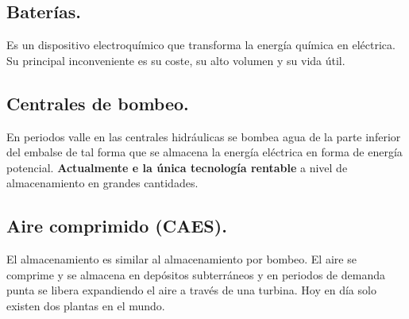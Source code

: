 \subsection{Baterías.}
Es un dispositivo electroquímico que transforma la energía química en eléctrica. Su principal inconveniente es su coste, su alto volumen y su vida útil.
\subsection{Centrales de bombeo.}
En periodos valle en las centrales hidráulicas se bombea agua de la parte inferior del embalse de tal forma que se almacena la energía eléctrica en forma de energía potencial. \textbf{Actualmente e la única tecnología rentable} a nivel de almacenamiento en grandes cantidades.
\subsection{Aire comprimido (CAES).}
El almacenamiento es similar al almacenamiento por bombeo. El aire se comprime y se almacena en depósitos subterráneos y en periodos de demanda punta se libera expandiendo el aire a través de una turbina. Hoy en día solo existen dos plantas en el mundo.